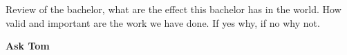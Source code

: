 Review of the bachelor, what are the effect this bachelor has in the world. How valid and important are the work we have done. If yes why, if no why not.

\textbf{Ask Tom}
